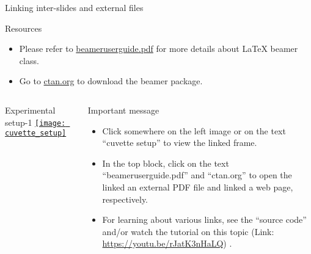 \documentclass{beamer}
\begin{document}
\begin{frame}[label=main]{Linking inter-slides and external files}	 	
	\begin{cexampleblock}{Resources}
		\begin{itemize} \scriptsize  
			\item[\faBook] Please refer to \href{beameruserguide.pdf}{beameruserguide.pdf} for more details about \LaTeX{} beamer class.
			\item[\faGlobe] Go to     \href{https://ctan.org/tex-archive/macros/latex/contrib/beamer}{ctan.org} to download the beamer package. 
		\end{itemize}
	\end{cexampleblock}

    \vskip-5mm 

	\begin{columns} 
		\begin{cblock}{Experimental setup-1}   
			\hyperlink{app1}{\texttt{[image: cuvette\_setup]}}\\			
			\hyperlink{app1}{} \hfill \cite{Phapal17}		
		\end{cblock}		
		
	\begin{alertblock}{Important message}
		\begin{itemize}  \scriptsize
			\item Click somewhere on the left image or on the text ``cuvette setup'' to view the linked frame. 
			\item In the top block, click on the text ``beameruserguide.pdf'' and ``ctan.org'' to open the linked an external PDF file and linked a web page, respectively.     
			\item For learning about various links, see the ``source code'' and/or watch the tutorial on this topic (Link: \href{https://youtu.be/rJatK3nHaLQ}{https://youtu.be/rJatK3nHaLQ}) .
		\end{itemize}	  
	\end{alertblock}
		
\end{columns}
\end{frame}
\end{document}
